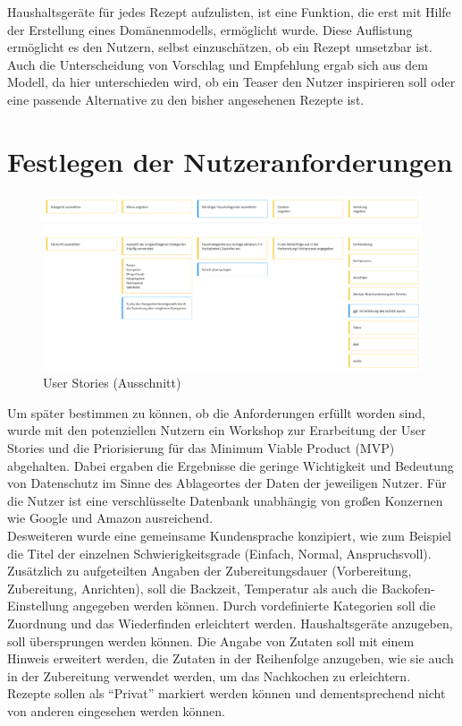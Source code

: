 Haushaltsgeräte für jedes Rezept aufzulisten, ist eine Funktion, die erst mit Hilfe der Erstellung eines Domänenmodells, ermöglicht wurde. Diese Auflistung ermöglicht es den Nutzern, selbst einzuschätzen, ob ein Rezept umsetzbar ist. Auch die Unterscheidung von Vorschlag und Empfehlung ergab sich aus dem Modell, da hier unterschieden wird, ob ein Teaser den Nutzer inspirieren soll oder eine passende Alternative zu den bisher angesehenen Rezepte ist.\\

\chapter{Festlegen der Nutzeranforderungen}
\label{sec:userstories}
\begin{figure}[h] %
    \includegraphics[width=1\textwidth]{images/userstories.png}
    \caption[User Stories (Ausschnitt)]{User Stories (Ausschnitt)}
    \label{fig:userstories}
\end{figure}
Um später bestimmen zu können, ob die Anforderungen erfüllt worden sind, wurde mit den potenziellen Nutzern ein Workshop zur Erarbeitung der User Stories und die Priorisierung für das Minimum Viable Product (MVP)\citep{Patton_2014} abgehalten. Dabei ergaben die Ergebnisse die geringe Wichtigkeit und Bedeutung von Datenschutz im Sinne des Ablageortes der Daten der jeweiligen Nutzer. Für die Nutzer ist eine verschlüsselte Datenbank unabhängig von großen Konzernen wie Google und Amazon ausreichend.\\ 

Desweiteren wurde eine gemeinsame Kundensprache konzipiert, wie zum Beispiel die Titel der einzelnen Schwierigkeitsgrade (Einfach, Normal, Anspruchsvoll). Zusätzlich zu aufgeteilten Angaben der Zubereitungsdauer (Vorbereitung, Zubereitung, Anrichten), soll die Backzeit, Temperatur als auch die Backofen-Einstellung angegeben werden können. Durch vordefinierte Kategorien soll die Zuordnung und das Wiederfinden erleichtert werden. Haushaltsgeräte anzugeben, soll übersprungen werden können. Die Angabe von Zutaten soll mit einem Hinweis erweitert werden, die Zutaten in der Reihenfolge anzugeben, wie sie auch in der Zubereitung verwendet werden, um das Nachkochen zu erleichtern. Rezepte sollen als {``Privat''} markiert werden können und dementsprechend nicht von anderen eingesehen werden können.\\ 


